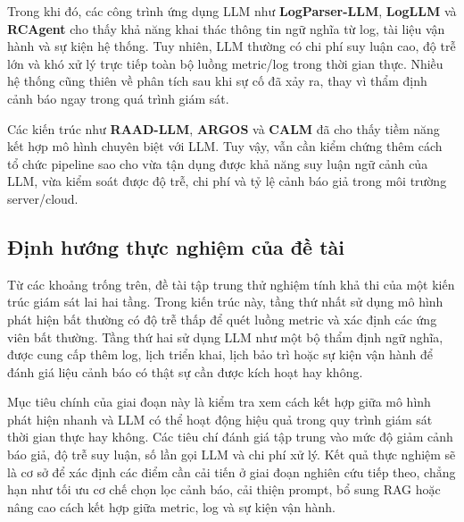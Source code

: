 Trong khi đó, các công trình ứng dụng LLM như \textbf{LogParser-LLM},\textbf{ LogLLM} và\textbf{ RCAgent} cho thấy khả năng khai thác thông tin ngữ nghĩa từ log, tài liệu vận hành và sự kiện hệ thống. Tuy nhiên, LLM thường có chi phí suy luận cao, độ trễ lớn và khó xử lý trực tiếp toàn bộ luồng metric/log trong thời gian thực. Nhiều hệ thống cũng thiên về phân tích sau khi sự cố đã xảy ra, thay vì thẩm định cảnh báo ngay trong quá trình giám sát.

Các kiến trúc như \textbf{RAAD-LLM}, \textbf{ARGOS} và \textbf{CALM} đã cho thấy tiềm năng kết hợp mô hình chuyên biệt với LLM. Tuy vậy, vẫn cần kiểm chứng thêm cách tổ chức pipeline sao cho vừa tận dụng được khả năng suy luận ngữ cảnh của LLM, vừa kiểm soát được độ trễ, chi phí và tỷ lệ cảnh báo giả trong môi trường server/cloud.

\subsection*{Định hướng thực nghiệm của đề tài}

Từ các khoảng trống trên, đề tài tập trung thử nghiệm tính khả thi của một kiến trúc giám sát lai hai tầng. Trong kiến trúc này, tầng thứ nhất sử dụng mô hình phát hiện bất thường có độ trễ thấp để quét luồng metric và xác định các ứng viên bất thường. Tầng thứ hai sử dụng LLM như một bộ thẩm định ngữ nghĩa, được cung cấp thêm log, lịch triển khai, lịch bảo trì hoặc sự kiện vận hành để đánh giá liệu cảnh báo có thật sự cần được kích hoạt hay không.

Mục tiêu chính của giai đoạn này là kiểm tra xem cách kết hợp giữa mô hình phát hiện nhanh và LLM có thể hoạt động hiệu quả trong quy trình giám sát thời gian thực hay không. Các tiêu chí đánh giá tập trung vào mức độ giảm cảnh báo giả, độ trễ suy luận, số lần gọi LLM và chi phí xử lý. Kết quả thực nghiệm sẽ là cơ sở để xác định các điểm cần cải tiến ở giai đoạn nghiên cứu tiếp theo, chẳng hạn như tối ưu cơ chế chọn lọc cảnh báo, cải thiện prompt, bổ sung RAG hoặc nâng cao cách kết hợp giữa metric, log và sự kiện vận hành.

